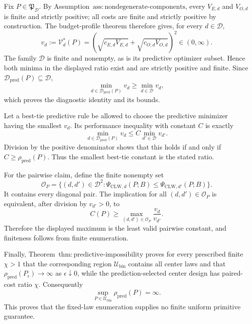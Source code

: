 Fix \(P\in\mathfrak P_{\mathcal D}\). By Assumption~\(\mathrm{ass{:}nondegenerate\text{-}components}\), every \(V_{E,d}\) and \(V_{O,d}\) is finite and strictly positive; all costs are finite and strictly positive by construction. The budget-profile theorem therefore gives, for every \(d\in\mathcal D\),
\[
 v_d:=\mathcal V_d^*(P)
 =\left(\sqrt{c_{E,d}V_{E,d}}+\sqrt{c_{O,d}V_{O,d}}\right)^2
 \in(0,\infty). \tag{1}
\]
The family \(\mathcal D\) is finite and nonempty, as is its predictive optimizer subset. Hence both minima in the displayed ratio exist and are strictly positive and finite. Since \(\mathcal D_{\mathrm{pred}}(P)\subseteq\mathcal D\),
\[
 \min_{d\in\mathcal D_{\mathrm{pred}}(P)}v_d
 \ge \min_{d\in\mathcal D}v_d,
\]
which proves the diagnostic identity and its bounds.

Let a best-tie predictive rule be allowed to choose the predictive minimizer having the smallest \(v_d\). Its performance inequality with constant \(C\) is exactly
\[
 \min_{d\in\mathcal D_{\mathrm{pred}}(P)}v_d
 \le C\min_{d'\in\mathcal D}v_{d'}.
\]
Division by the positive denominator shows that this holds if and only if \(C\ge\rho_{\mathrm{pred}}(P)\). Thus the smallest best-tie constant is the stated ratio.

For the pairwise claim, define the finite nonempty set
\[
 \mathcal O_P=\{(d,d')\in\mathcal D^2:
 \Psi_{\mathrm{CLW},d}(P;B)\le
 \Psi_{\mathrm{CLW},d'}(P;B)\}.
\]
It contains every diagonal pair. The implication for all \((d,d')\in\mathcal O_P\) is equivalent, after division by \(v_{d'}>0\), to
\[
 C(P)\ge\max_{(d,d')\in\mathcal O_P}\frac{v_d}{v_{d'}}.
\]
Therefore the displayed maximum is the least valid pairwise constant, and finiteness follows from finite enumeration.

Finally, Theorem~\(\mathrm{thm{:}predictive\text{-}impossibility}\) proves for every prescribed finite \(\chi>1\) that the corresponding region \(\mathcal U_{\mathrm{bin}}\) contains all center laws and that \(\rho_{\mathrm{pred}}(P_\epsilon)\to\infty\) as \(\epsilon\downarrow0\), while the prediction-selected center design has paired-cost ratio \(\chi\). Consequently
\[
 \sup_{P\in\mathcal U_{\mathrm{bin}}}\rho_{\mathrm{pred}}(P)=\infty.
\]
This proves that the fixed-law enumeration supplies no finite uniform primitive guarantee.